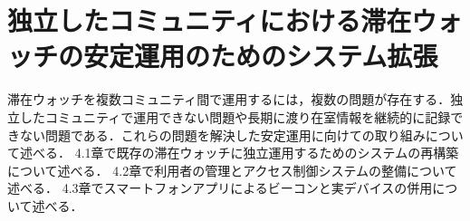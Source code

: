 \chapter{独立したコミュニティにおける滞在ウォッチの安定運用のためのシステム拡張}\label{4}

滞在ウォッチを複数コミュニティ間で運用するには，複数の問題が存在する．独立したコミュニティで運用できない問題や長期に渡り在室情報を継続的に記録できない問題である．これらの問題を解決した安定運用に向けての取り組みについて述べる．
4.1章で既存の滞在ウォッチに独立運用するためのシステムの再構築について述べる．
4.2章で利用者の管理とアクセス制御システムの整備について述べる．
4.3章でスマートフォンアプリによるビーコンと実デバイスの併用について述べる．







